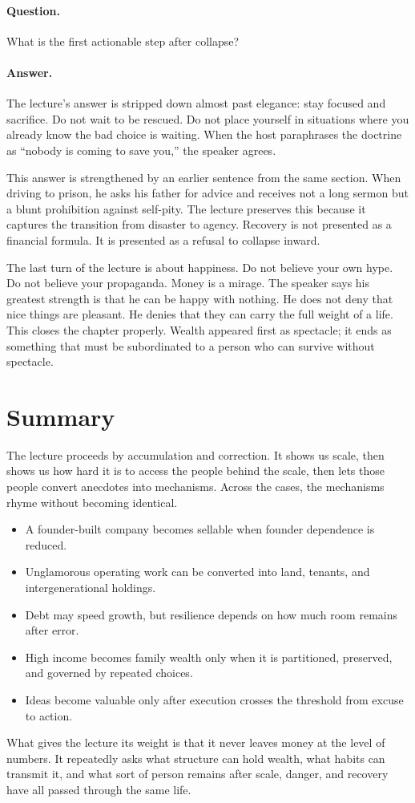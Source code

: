 \paragraph{Question.} What is the first actionable step after collapse?

\paragraph{Answer.} The lecture's answer is stripped down almost past elegance: stay focused and sacrifice. Do not wait to be rescued. Do not place yourself in situations where you already know the bad choice is waiting. When the host paraphrases the doctrine as ``nobody is coming to save you,'' the speaker agrees.

This answer is strengthened by an earlier sentence from the same section. When driving to prison, he asks his father for advice and receives not a long sermon but a blunt prohibition against self-pity. The lecture preserves this because it captures the transition from disaster to agency. Recovery is not presented as a financial formula. It is presented as a refusal to collapse inward.

The last turn of the lecture is about happiness. Do not believe your own hype. Do not believe your propaganda. Money is a mirage. The speaker says his greatest strength is that he can be happy with nothing. He does not deny that nice things are pleasant. He denies that they can carry the full weight of a life. This closes the chapter properly. Wealth appeared first as spectacle; it ends as something that must be subordinated to a person who can survive without spectacle.

\section{Summary}

The lecture proceeds by accumulation and correction. It shows us scale, then shows us how hard it is to access the people behind the scale, then lets those people convert anecdotes into mechanisms. Across the cases, the mechanisms rhyme without becoming identical.

\begin{itemize}
\item A founder-built company becomes sellable when founder dependence is reduced.
\item Unglamorous operating work can be converted into land, tenants, and intergenerational holdings.
\item Debt may speed growth, but resilience depends on how much room remains after error.
\item High income becomes family wealth only when it is partitioned, preserved, and governed by repeated choices.
\item Ideas become valuable only after execution crosses the threshold from excuse to action.
\end{itemize}

What gives the lecture its weight is that it never leaves money at the level of numbers. It repeatedly asks what structure can hold wealth, what habits can transmit it, and what sort of person remains after scale, danger, and recovery have all passed through the same life.